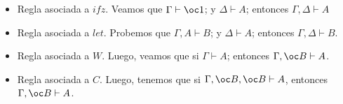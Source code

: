 \documentclass[a4paper,11pt]{article}
\begin{document}
\begin{itemize}
  \begin{prooftree}

  \end{prooftree}

\item Regla asociada a $ifz$. Veamos que $\Gamma \vdash \oc 1$; y $\Delta \vdash A$; entonces 
  $\Gamma, \Delta \vdash A$

  \begin{prooftree}
  \end{prooftree}

\item Regla asociada a $let$. Probemos que $\Gamma, A \vdash B$; y $\Delta \vdash A$; entonces
  $\Gamma, \Delta \vdash B$.

  \begin{prooftree}
  \end{prooftree}

\item Regla asociada a $W$. Luego, veamos que si $\Gamma \vdash A$; entonces $\Gamma, \oc B \vdash A$.

  \begin{prooftree}
  \end{prooftree}

\item Regla asociada a $C$. Luego, tenemos que si $\Gamma, \oc B, \oc B \vdash A$, entonces
  $\Gamma, \oc B \vdash A$.

  \begin{prooftree}
  \end{prooftree}

\end{itemize}
\end{document}
